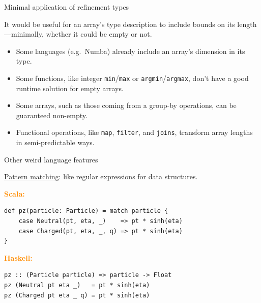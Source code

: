 \documentclass[aspectratio=169]{beamer}
\begin{document}
\begin{frame}{Minimal application of refinement types}
\Large
\vspace{0.25 cm}
\begin{center}
It would be useful for an array's type description to include bounds on its length---minimally, whether it could be empty or not.

\large
\vspace{0.5 cm}
\begin{minipage}{0.85\linewidth}
\begin{itemize}
\item Some languages (e.g.\ Numba) already include an array's dimension in its type.
\item Some functions, like integer {\tt min}/{\tt max} or {\tt argmin}/{\tt argmax}, don't have a good runtime solution for empty arrays.
\item Some arrays, such as those coming from a group-by operations, can be guaranteed non-empty.
\item Functional operations, like {\tt map}, {\tt filter}, and {\tt joins}, transform array lengths in semi-predictable ways.
\end{itemize}
\end{minipage}
\end{center}
\end{frame}

\begin{frame}[fragile]{Other weird language features}
\Large
\vspace{0.5 cm}

\underline{Pattern matching}: like regular expressions for data structures.

\vspace{0.65 cm}
\textcolor{darkorange}{\bf Scala:}

\begin{center}
\begin{minipage}{0.85\linewidth}
\normalsize
\begin{verbatim}
def pz(particle: Particle) = match particle {
    case Neutral(pt, eta, _)    => pt * sinh(eta)
    case Charged(pt, eta, _, q) => pt * sinh(eta)
}
\end{verbatim}
\end{minipage}
\end{center}

\vspace{0.25 cm}
\textcolor{darkorange}{\bf Haskell:}

\begin{center}
\begin{minipage}{0.85\linewidth}
\normalsize
\begin{verbatim}
pz :: (Particle particle) => particle -> Float
pz (Neutral pt eta _)   = pt * sinh(eta)
pz (Charged pt eta _ q) = pt * sinh(eta)
\end{verbatim}
\end{minipage}
\end{center}
\end{frame}
\end{document}
